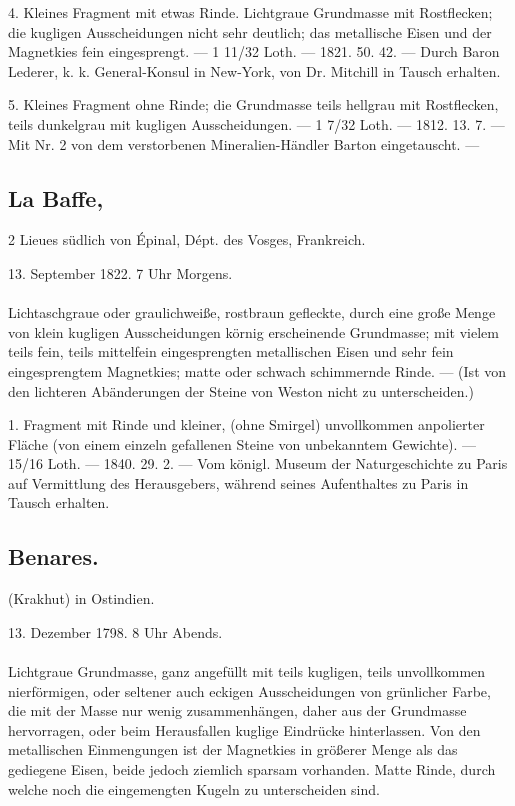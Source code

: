 \documentclass[a4paper, 11pt, oneside, polutonikogreek, german]{article}
\begin{document}
4. Kleines Fragment mit etwas Rinde. Lichtgraue Grundmasse mit Rostflecken; die kugligen Ausscheidungen nicht sehr deutlich; das metallische Eisen und der Magnetkies fein eingesprengt. — 1 11/32 Loth. — 1821. 50. 42. — Durch Baron Lederer, k. k. General-Konsul in New-York, von Dr. Mitchill in Tausch erhalten.

5. Kleines Fragment ohne Rinde; die Grundmasse teils hellgrau mit Rostflecken, teils dunkelgrau mit kugligen Ausscheidungen. — 1 7/32 Loth. — 1812. 13. 7. — Mit Nr. 2 von dem verstorbenen Mineralien-Händler Barton eingetauscht. —
\subsection{La Baffe,}
\begin{center}
\small
2 Lieues südlich von Épinal, Dépt. des Vosges, Frankreich.

13. September 1822. 7 Uhr Morgens.
\end{center}
\paragraph{}
Lichtaschgraue oder graulichweiße, rostbraun gefleckte, durch eine große Menge von klein kugligen Ausscheidungen körnig erscheinende Grundmasse; mit vielem teils fein, teils mittelfein eingesprengten metallischen Eisen und sehr fein eingesprengtem Magnetkies; matte oder schwach schimmernde Rinde. — (Ist von den lichteren Abänderungen der Steine von Weston nicht zu unterscheiden.)

1. Fragment mit Rinde und kleiner, (ohne Smirgel) unvollkommen anpolierter Fläche (von einem einzeln gefallenen Steine von unbekanntem Gewichte). — 15/16 Loth. — 1840. 29. 2. — Vom königl. Museum der Naturgeschichte zu Paris auf Vermittlung des Herausgebers, während seines Aufenthaltes zu Paris in Tausch erhalten.
\subsection{Benares.}
\begin{center}
\small
(Krakhut) in Ostindien.

13. Dezember 1798. 8 Uhr Abends.
\end{center}
\paragraph{}
Lichtgraue Grundmasse, ganz angefüllt mit teils kugligen, teils unvollkommen nierförmigen, oder seltener auch eckigen Ausscheidungen von grünlicher Farbe, die mit der Masse nur wenig zusammenhängen, daher aus der Grundmasse hervorragen, oder beim Herausfallen kuglige Eindrücke hinterlassen. Von den metallischen Einmengungen ist der Magnetkies in größerer Menge als das gediegene Eisen, beide jedoch ziemlich sparsam vorhanden. Matte Rinde, durch welche noch die eingemengten Kugeln zu unterscheiden sind.
\end{document}
